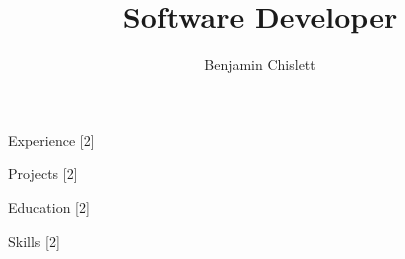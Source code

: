 \documentclass[11pt, letterpaper]{article}
\title{Software Developer}
\author{Benjamin Chislett}
\date{}
\begin{document}
\begin{center}
  \Huge\theauthor
  \par
  \huge\thetitle
  \par
\end{center}

\begin{section}{Experience}
[2]
\end{section}

\begin{section}{Projects}
[2]
\end{section}

\begin{section}{Education}
[2]
\end{section}

\begin{section}{Skills}
[2]
\end{section}
\end{document}
